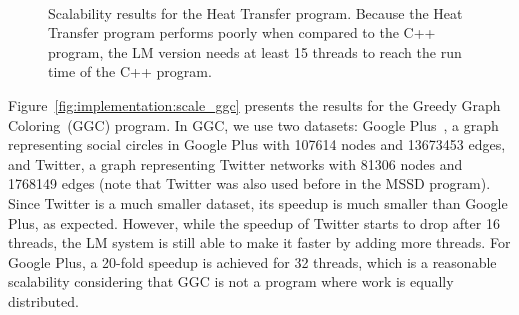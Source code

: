 \begin{figure}[]
\begin{subfigure}[b]{\plotsize\textwidth}
                \label{fig:implementation:scale_ht120}
        \end{subfigure}\\
        \caption{Scalability results for the Heat Transfer program. Because the
           Heat Transfer program performs poorly when compared to the C++ program,
           the LM version needs at least 15 threads to reach the run time of the C++
           program.}
        \label{fig:implementation:scale_ht}
\end{figure}

Figure~\ref{fig:implementation:scale_ggc} presents the results for the Greedy
Graph Coloring~(GGC) program. In GGC, we use two datasets: Google
Plus~\cite{snapnets}, a graph representing social circles in Google Plus with
107614 nodes and 13673453 edges, and Twitter, a graph representing Twitter
networks with 81306 nodes and 1768149 edges (note that Twitter was also used
before in the MSSD program).  Since Twitter is a much smaller dataset, its
speedup is much smaller than Google Plus, as expected. However, while the
speedup of Twitter starts to drop after 16 threads, the LM system is still able
to make it faster by adding more threads. For Google Plus, a 20-fold speedup is
achieved for 32 threads, which is a reasonable scalability considering that GGC
is not a program where work is equally distributed.

